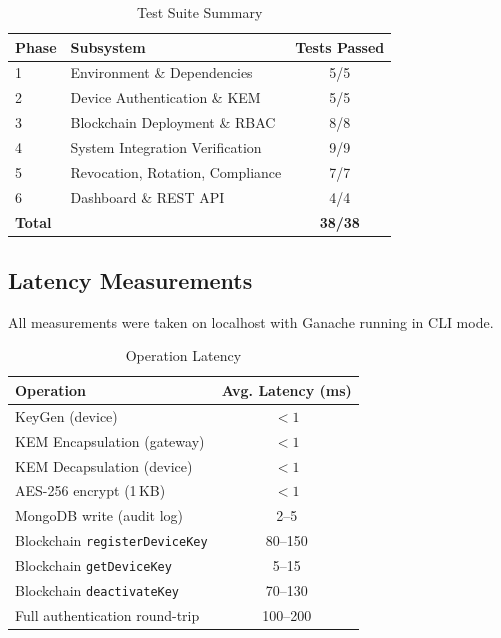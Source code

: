 \documentclass[conference]{IEEEtran}
\begin{document}
\begin{table}[!t]
\centering
\caption{Test Suite Summary}
\label{tab:tests}
\begin{tabular}{llc}
\toprule
\textbf{Phase} & \textbf{Subsystem} & \textbf{Tests Passed} \\
\midrule
1 & Environment \& Dependencies       & 5/5  \\
2 & Device Authentication \& KEM      & 5/5  \\
3 & Blockchain Deployment \& RBAC     & 8/8  \\
4 & System Integration Verification  & 9/9  \\
5 & Revocation, Rotation, Compliance  & 7/7  \\
6 & Dashboard \& REST API             & 4/4  \\
\midrule
\textbf{Total} &                              & \textbf{38/38} \\
\bottomrule
\end{tabular}
\end{table}

\subsection{Latency Measurements}
All measurements were taken on localhost with Ganache running in CLI mode.

\begin{table}[!t]
\centering
\caption{Operation Latency}
\label{tab:latency}
\begin{tabular}{lc}
\toprule
\textbf{Operation} & \textbf{Avg. Latency (ms)} \\
\midrule
KeyGen (device)              & $< 1$   \\
KEM Encapsulation (gateway)  & $< 1$   \\
KEM Decapsulation (device)   & $< 1$   \\
AES-256 encrypt (1\,KB)      & $< 1$   \\
MongoDB write (audit log)    & 2--5    \\
Blockchain \texttt{registerDeviceKey} & 80--150  \\
Blockchain \texttt{getDeviceKey}      & 5--15    \\
Blockchain \texttt{deactivateKey}     & 70--130  \\
Full authentication round-trip        & 100--200 \\
\bottomrule
\end{tabular}
\end{table}
\end{document}

